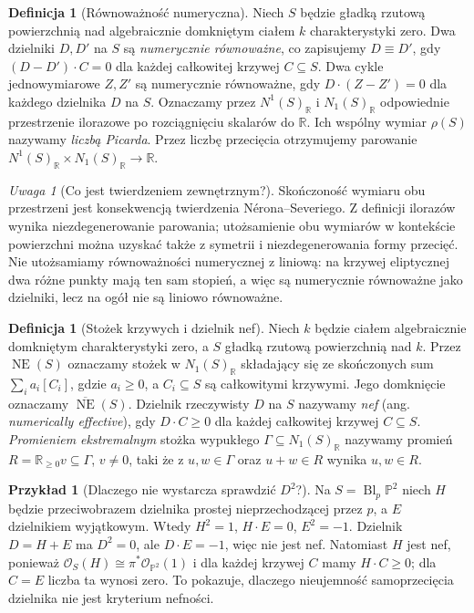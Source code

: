 \documentclass[11pt,a4paper,openany]{report}
\numberwithin{equation}{section}
\theoremstyle{plain}
\theoremstyle{definition}
\newtheorem{definicja}[twierdzenie]{Definicja}
\newtheorem{przyklad}[twierdzenie]{Przykład}
\theoremstyle{remark}
\newtheorem{uwaga}[twierdzenie]{Uwaga}
\newcommand{\R}{\mathbb R}
\newcommand{\PP}{\mathbb P}
\begin{document}
\begin{definicja}[Równoważność numeryczna]
\label{def:ga8-numerical}
Niech $S$ będzie gładką rzutową powierzchnią nad algebraicznie
domkniętym ciałem $k$ charakterystyki zero. Dwa dzielniki
$D,D'$ na $S$ są \emph{numerycznie równoważne}, co zapisujemy
$D\equiv D'$, gdy $(D-D')\cdot C=0$ dla każdej całkowitej
krzywej $C\subseteq S$. Dwa cykle jednowymiarowe $Z,Z'$
są numerycznie równoważne, gdy $D\cdot(Z-Z')=0$ dla
każdego dzielnika $D$ na $S$. Oznaczamy przez
$N^1(S)_{\R}$ i $N_1(S)_{\R}$ odpowiednie przestrzenie
ilorazowe po rozciągnięciu skalarów do $\R$.
Ich wspólny wymiar $\rho(S)$ nazywamy \emph{liczbą Picarda}.
Przez liczbę przecięcia otrzymujemy parowanie
$N^1(S)_{\R}\times N_1(S)_{\R}\to\R$.
\end{definicja}

\begin{uwaga}[Co jest twierdzeniem zewnętrznym?]
Skończoność wymiaru obu przestrzeni jest konsekwencją
twierdzenia Nérona--Severiego. Z definicji ilorazów
wynika niezdegenerowanie parowania; utożsamienie obu
wymiarów w kontekście powierzchni można uzyskać także
z symetrii i niezdegenerowania formy przecięć.
Nie utożsamiamy równoważności numerycznej z liniową:
na krzywej eliptycznej dwa różne punkty mają ten sam
stopień, a więc są numerycznie równoważne jako dzielniki,
lecz na ogół nie są liniowo równoważne.
\end{uwaga}

\begin{definicja}[Stożek krzywych i dzielnik nef]
\label{def:ga8-nef}
Niech $k$ będzie ciałem algebraicznie domkniętym
charakterystyki zero, a $S$ gładką rzutową
powierzchnią nad $k$. Przez $\operatorname{NE}(S)$
oznaczamy stożek w $N_1(S)_{\R}$ składający się ze
skończonych sum $\sum_i a_i[C_i]$, gdzie $a_i\ge0$,
a $C_i\subseteq S$ są całkowitymi krzywymi.
Jego domknięcie oznaczamy $\overline{\operatorname{NE}}(S)$.
Dzielnik rzeczywisty $D$ na $S$ nazywamy \emph{nef}
(ang. \emph{numerically effective}), gdy $D\cdot C\ge0$
dla każdej całkowitej krzywej $C\subseteq S$.
\emph{Promieniem ekstremalnym} stożka wypukłego
$\Gamma\subseteq N_1(S)_{\R}$ nazywamy promień
$R=\R_{\ge0}v\subseteq\Gamma$, $v\ne0$, taki że
z $u,w\in\Gamma$ oraz $u+w\in R$ wynika $u,w\in R$.
\end{definicja}

\begin{przyklad}[Dlaczego nie wystarcza sprawdzić $D^2$?]
Na $S=\operatorname{Bl}_p\PP^2$ niech $H$ będzie
przeciwobrazem dzielnika prostej nieprzechodzącej przez $p$,
a $E$ dzielnikiem wyjątkowym.
Wtedy $H^2=1$, $H\cdot E=0$, $E^2=-1$.
Dzielnik $D=H+E$ ma $D^2=0$, ale $D\cdot E=-1$,
więc nie jest nef. Natomiast $H$ jest nef, ponieważ
$\mathcal O_S(H)\cong\pi^*\mathcal O_{\PP^2}(1)$
i dla każdej krzywej
$C$ mamy $H\cdot C\ge0$; dla $C=E$ liczba ta wynosi zero.
To pokazuje, dlaczego nieujemność samoprzecięcia
dzielnika nie jest kryterium nefności.
\end{przyklad}
\end{document}
